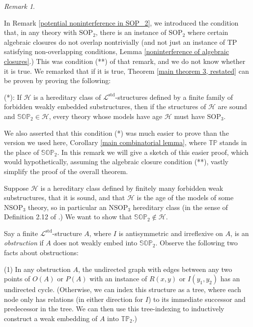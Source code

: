 \documentclass{amsart}
\theoremstyle{definition}
\theoremstyle{remark}
\newtheorem{remark}[theorem]{Remark}
\numberwithin{equation}{section}
\begin{document}
\begin{remark}
    \label{potential simplified proof}

In Remark \ref{potential noninterference in SOP_2}, we introduced the condition that, in any theory with $\mathrm{SOP}_{2}$, there is an instance of $\mathrm{SOP}_{2}$ where certain algebraic closures do not overlap nontrivially (and not just an instance of $\mathrm{TP}$ satisfying non-overlapping conditions, Lemma \ref{noninterference of algebraic closures}.) This was condition (**) of that remark, and we do not know whether it is true. We remarked that if it is true, Theorem \ref{main theorem 3, restated} can be proven by proving the following:

(*): If $\mathcal{H}$ is a hereditary class of $\mathcal{L}^{\mathrm{std}}$-structures defined by a finite family of forbidden weakly embedded substructures, then if the structures of $\mathcal{H}$ are sound and $\mathbb{SOP}_2 \in \mathcal{H}$, every theory whose models have age $\mathcal{H}$ must have $\mathrm{SOP}_{3}$.

We also asserted that this condition (*) was much easier to prove than the version we used here, Corollary \ref{main combinatorial lemma}, where $\mathbb{TP}$ stands in the place of $\mathbb{SOP}_{2}$. In this remark we will give a sketch of this easier proof, which would hypothetically, assuming the algebraic closure condition (**), vastly simplify the proof of the overall theorem.


Suppose $\mathcal{H}$ is a hereditary class defined by finitely many forbidden weak substructures, that it is sound, and that $\mathcal{H}$ is the age of the models of some $\mathrm{NSOP}_{3}$ theory, so in particular an $\mathrm{NSOP}_{3}$ hereditary class (in the sense of Definition 2.12 of \cite{ApproxOrder}.) We want to show that $\mathbb{SOP}_{2} \notin \mathcal{H}$.

Say a finite $\mathcal{L}^{\mathrm{std}}$-structure $A$, where $I$ is antisymmetric and irreflexive on $A$, is an \textit{obstruction} if $A$ does not weakly embed into $\mathbb{SOP}_{2}$.   Observe the following two facts about obstructions:

(1) In any obstruction $A$, the undirected graph with edges between any two points of $O(A)$ or $P(A)$ with an instance of $R(x, y)$ or $I(y_{1}, y_{2})$ has an undirected cycle. (Otherwise, we can index this structure as a tree, where each node only has relations (in either direction for $I$) to its immediate successor and predecessor in the tree. We can then use this tree-indexing to inductively construct a weak embedding of $A$ into $\mathbb{TP}_{2}$.)


\end{remark}
\end{document}
